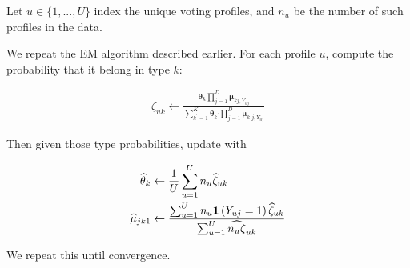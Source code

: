 \documentclass[11pt]{article}
\begin{document}
Let \(u \in \{1, ..., U\}\) index the unique voting profiles, and \(n_{u}\) be the number of such profiles in the data. 

We repeat the EM algorithm described earlier. For each profile \(u\), compute the probability that it belong in type \(k\):

\begin{align}
\zeta_{uk} \leftarrow \frac{\bm{\theta}_{k}\prod^{D}_{j=1}\bm{\mu}_{kj,Y_{uj}}}
{\sum^{K}_{k^\prime=1}\bm{\theta}_{k^\prime}\prod^{D}_{j=1}\bm{\mu}_{k^\prime j,Y_{uj}}}
\end{align}

Then given those type probabilities, update with

\begin{align}
\widehat{\theta}_{k} &\leftarrow \frac{1}{U}\sum^U_{u = 1}n_{u}\widehat{\zeta}_{uk}\\
\widehat{\mu}_{jk1} &\leftarrow\frac{\sum^U_{u=1}n_{u}\bm{1}\left(Y_{uj} = 1\right)\widehat{\zeta}_{uk}}{\sum^{U}_{u=1}\widehat{n_{u}\zeta}_{uk}}\\
\end{align}

We repeat this until convergence.
\end{document}
